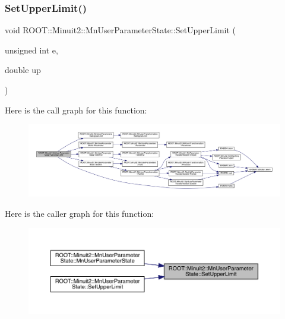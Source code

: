 \mbox{\label{classROOT_1_1Minuit2_1_1MnUserParameterState_ab79ab45c03ce6dcf71dfc90d967955cf}} 
\subsubsection{\texorpdfstring{SetUpperLimit()}{SetUpperLimit()}\hspace{0.1cm}{\footnotesize\ttfamily [1/6]}}
{\footnotesize\ttfamily void R\+O\+O\+T\+::\+Minuit2\+::\+Mn\+User\+Parameter\+State\+::\+Set\+Upper\+Limit (\begin{DoxyParamCaption}\item[{unsigned int}]{e,  }\item[{double}]{up }\end{DoxyParamCaption})}

Here is the call graph for this function\+:
\nopagebreak
\begin{figure}[H]
\begin{center}
\leavevmode
\includegraphics[width=350pt]{d3/de0/classROOT_1_1Minuit2_1_1MnUserParameterState_ab79ab45c03ce6dcf71dfc90d967955cf_cgraph}
\end{center}
\end{figure}
Here is the caller graph for this function\+:
\nopagebreak
\begin{figure}[H]
\begin{center}
\leavevmode
\includegraphics[width=350pt]{d3/de0/classROOT_1_1Minuit2_1_1MnUserParameterState_ab79ab45c03ce6dcf71dfc90d967955cf_icgraph}
\end{center}
\end{figure}
\mbox{\label{classROOT_1_1Minuit2_1_1MnUserParameterState_ab79ab45c03ce6dcf71dfc90d967955cf}} 
